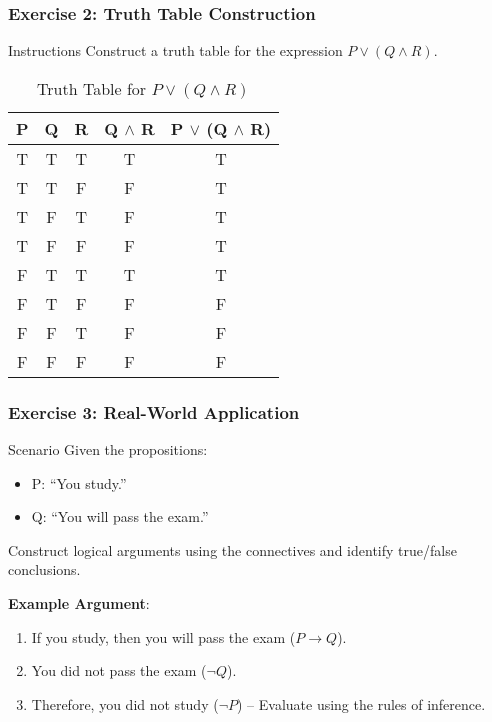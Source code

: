 \documentclass[aspectratio=169]{beamer}
\begin{document}
\begin{frame}[fragile]
    \frametitle{Exercise 2: Truth Table Construction}
    \begin{block}{Instructions}
        Construct a truth table for the expression \( P \lor (Q \land R) \).
    \end{block}
    
    \begin{table}[]
        \centering
        \begin{tabular}{|c|c|c|c|c|}
            \hline
            P & Q & R & Q $\land$ R & P $\lor$ (Q $\land$ R) \\ \hline
            T & T & T & T & T \\ \hline
            T & T & F & F & T \\ \hline
            T & F & T & F & T \\ \hline
            T & F & F & F & T \\ \hline
            F & T & T & T & T \\ \hline
            F & T & F & F & F \\ \hline
            F & F & T & F & F \\ \hline
            F & F & F & F & F \\ \hline
        \end{tabular}
        \caption{Truth Table for \( P \lor (Q \land R) \)}
    \end{table}
\end{frame}

\begin{frame}[fragile]
    \frametitle{Exercise 3: Real-World Application}
    \begin{block}{Scenario}
        Given the propositions:
        \begin{itemize}
            \item P: “You study.”
            \item Q: “You will pass the exam.”
        \end{itemize}
        Construct logical arguments using the connectives and identify true/false conclusions.
    \end{block}

    \textbf{Example Argument}:
    \begin{enumerate}
        \item If you study, then you will pass the exam (\(P \rightarrow Q\)).
        \item You did not pass the exam (\(\neg Q\)).
        \item Therefore, you did not study (\(\neg P\)) – Evaluate using the rules of inference.
    \end{enumerate}
\end{frame}
\end{document}
